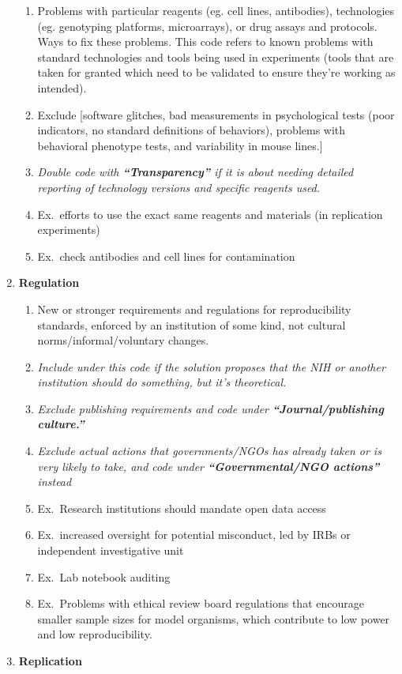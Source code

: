 \documentclass[
]{scrartcl}
\begin{document}
\begin{enumerate}
  \begin{enumerate}

  \item
    Problems with particular reagents (eg. cell lines, antibodies),
    technologies (eg. genotyping platforms, microarrays), or drug assays
    and protocols. Ways to fix these problems. This code refers to known
    problems with standard technologies and tools being used in
    experiments (tools that are taken for granted which need to be
    validated to ensure they're working as intended).
  \item
    Exclude {[}software glitches, bad measurements in psychological
    tests (poor indicators, no standard definitions of behaviors),
    problems with behavioral phenotype tests, and variability in mouse
    lines.{]}
  \item
    \emph{Double code with \textbf{``Transparency''} if it is about
    needing detailed reporting of technology versions and specific
    reagents used.}
  \item
    Ex.~efforts to use the exact same reagents and materials (in
    replication experiments)
  \item
    Ex.~check antibodies and cell lines for contamination
  \end{enumerate}
\item
  \textbf{Regulation}

  \begin{enumerate}

  \item
    New or stronger requirements and regulations for reproducibility
    standards, enforced by an institution of some kind, not cultural
    norms/informal/voluntary changes.
  \item
    \emph{Include under this code if the solution proposes that the NIH
    or another institution should do something, but it's theoretical.}
  \item
    \emph{Exclude publishing requirements and code under
    \textbf{``Journal/publishing culture.''} }
  \item
    \emph{Exclude actual actions that governments/NGOs has already taken
    or is very likely to take, and code under \textbf{``Governmental/NGO
    actions''} instead}
  \item
    Ex.~Research institutions should mandate open data access
  \item
    Ex.~increased oversight for potential misconduct, led by IRBs or
    independent investigative unit
  \item
    Ex.~Lab notebook auditing
  \item
    Ex.~Problems with ethical review board regulations that encourage
    smaller sample sizes for model organisms, which contribute to low
    power and low reproducibility.
  \end{enumerate}
\item
  \textbf{Replication}


\end{enumerate}
\end{document}
